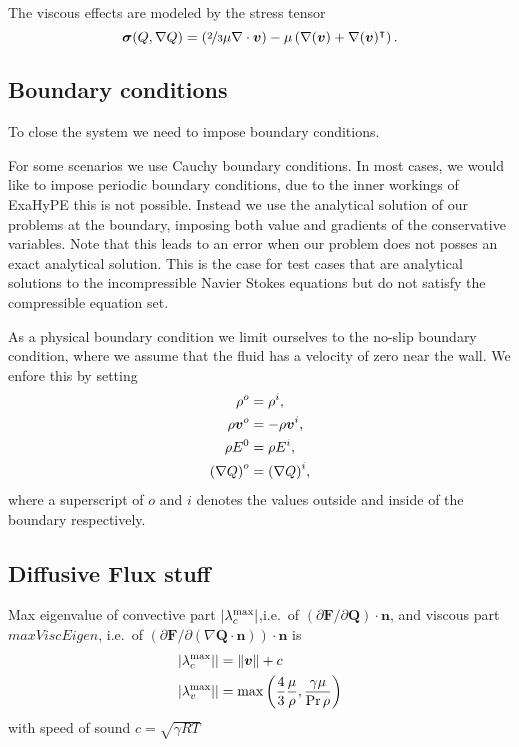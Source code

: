 The viscous effects are modeled by the stress tensor
\begin{equation}
  \label{eq:stress-tensor}
  \bm{\sigma}(Q, \nabla Q) = \left(\nicefrac{2}{3} \mu \nabla \cdot \bm{v} \right) -
  \mu \left( \nabla (\bm{v}) + \nabla ( \bm{v} )^\intercal \right).
\end{equation}

\subsection{Boundary conditions}
To close the system we need to impose boundary conditions.

For some scenarios we use Cauchy boundary conditions.
In most cases, we would like to impose periodic boundary conditions, due to the inner workings of ExaHyPE this is not possible.
Instead we use the analytical solution of our problems at the boundary, imposing both value and gradients of the conservative variables.
Note that this leads to an error when our problem does not posses an exact analytical solution.
This is the case for test cases that are analytical solutions to the incompressible Navier Stokes equations but do not satisfy the compressible equation set.

As a physical boundary condition we limit ourselves to the no-slip boundary condition, where we assume that the fluid has a velocity of zero near the wall.
We enfore this by setting
\begin{align}
  \rho^o &= \rho^i, \\
  \rho \bm{v}^o &= -\rho \bm{v}^i, \\
  \rho E^0 &= \rho E^i,\\
  {(\nabla Q)}^o &= {(\nabla Q)}^i,
\end{align}
where a superscript of $o$ and $i$ denotes the values outside and inside of the boundary respectively.


\subsection{Diffusive Flux stuff}
Max eigenvalue of convective part $\vert \lambda_c^{\text{max}} \vert$,i.e.\ of $\left( \partial \bm{F}/\partial \bm{Q}\right) \cdot \bm{n}$,
and viscous part $maxViscEigen$, i.e.\ of $\left( \partial \bm{F}/\partial \left( \nabla \bm{Q} \cdot \bm{n} \right)\right) \cdot \bm{n}$
is
\begin{align}
  \vert \lambda_c^{\text{max}} \vert \vert  &= \Vert \bm{v} \Vert + c\\
  \vert \lambda_v^{\text{max}} \vert \vert &= \max \left( \frac{4}{3} \frac{\mu}{\rho}
                                       , \frac{\gamma \mu}{\Pr \rho} \right)
\end{align}
with speed of sound $c = \sqrt{\gamma R T }$

